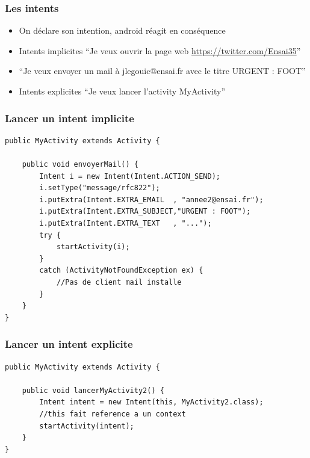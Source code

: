 \documentclass{beamer}
\begin{document}
\begin{frame}[fragile]
\frametitle{Les intents}
\begin{itemize}
 \item On déclare son intention, android réagit en conséquence
 \item Intents implicites ``Je veux ouvrir la page web \url{https://twitter.com/Ensai35}''
 \item ``Je veux envoyer un mail à jlegouic@ensai.fr avec le titre URGENT : FOOT''
 \item Intents explicites ``Je veux lancer l'activity MyActivity''
 \end{itemize}
\end{frame}
\begin{frame}[fragile]
\frametitle{Lancer un intent implicite}
\begin{lstlisting}
public MyActivity extends Activity {
    
    public void envoyerMail() {
        Intent i = new Intent(Intent.ACTION_SEND);
        i.setType("message/rfc822");
        i.putExtra(Intent.EXTRA_EMAIL  , "annee2@ensai.fr");
        i.putExtra(Intent.EXTRA_SUBJECT,"URGENT : FOOT"); 
        i.putExtra(Intent.EXTRA_TEXT   , "...");
        try {
            startActivity(i);
        } 
        catch (ActivityNotFoundException ex) {
            //Pas de client mail installe
        }
    }	
}
\end{lstlisting}
\end{frame}
\begin{frame}[fragile]
\frametitle{Lancer un intent explicite}
\begin{lstlisting}
public MyActivity extends Activity {
    
    public void lancerMyActivity2() {
        Intent intent = new Intent(this, MyActivity2.class); 
        //this fait reference a un context
        startActivity(intent);
    }	
}
\end{lstlisting}
\end{frame}
\end{document}
